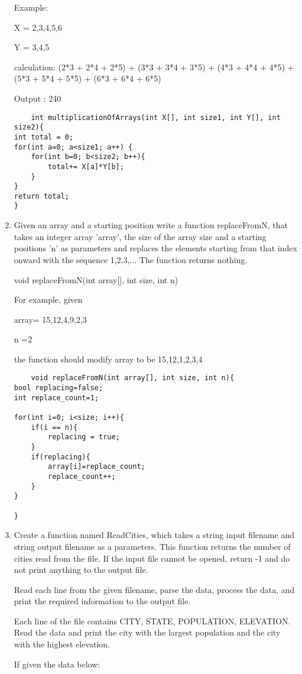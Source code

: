 \documentclass{article}
\begin{document}
\begin{enumerate}
Example:

X = {2,3,4,5,6}

Y = {3,4,5}

calculation:   (2*3 + 2*4 + 2*5) + (3*3 + 3*4 + 3*5) + (4*3 + 4*4 + 4*5) + (5*3 + 5*4 + 5*5) + (6*3 + 6*4 + 6*5)

Output : 240
\begin{lstlisting}
	int multiplicationOfArrays(int X[], int size1, int Y[], int size2){
int total = 0;
for(int a=0; a<size1; a++) {
    for(int b=0; b<size2; b++){
        total+= X[a]*Y[b];
    }
}
return total;
}
\end{lstlisting}

\item Given an array and a starting position write a function replaceFromN, that takes an integer array 'array', the size of the array size and a starting positions 'n' as parameters and replaces the elements starting from that index onward with the sequence 1,2,3,... The function returns nothing.

void replaceFromN(int array[], int size, int n)

For example, given 

array= {15,12,4,9,2,3}

n =2

the function should modify array to be {15,12,1,2,3,4}
\begin{lstlisting}
	void replaceFromN(int array[], int size, int n){
bool replacing=false;
int replace_count=1;

for(int i=0; i<size; i++){
    if(i == n){
        replacing = true;
    }
    if(replacing){
        array[i]=replace_count;
        replace_count++;
    }
}

}
\end{lstlisting}
\item Create a function named ReadCities, which takes a string input filename and string output filename as a parameters.  This function returns the number of cities read from the file.  If the input file cannot be opened, return -1 and do not print anything to the output file.

Read each line from the given filename, parse the data, process the data, and print the required information to the output file. 

Each line of the file contains CITY, STATE, POPULATION, ELEVATION.  Read the data and print the city with the largest population and the city with the highest elevation.

If given the data below:


\end{enumerate}
\end{document}
